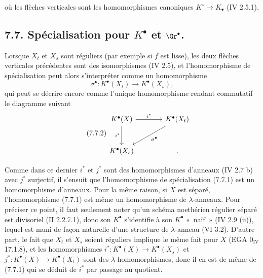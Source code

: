 où les
flèches verticales sont les homomorphismes canoniques \(K^\circ\to K_\bullet\) (IV 2.5.1).

\subsection*{7.7. Spécialisation pour \(K^\bullet\) et \(\Gr^\bullet\).}
Lorsque \(X_t\) et \(X_s\) sont réguliers (par exemple si \(f\) est lisse), les deux flèches verticales précédentes sont des isomorphismes (IV 2.5), et l'homomorphisme de spécialisation peut alors s'interpréter comme un homomorphisme
\begin{equation}\tag{7.7.1}
  \sigma^\bullet:K^\bullet(X_t)\longrightarrow K^\bullet(X_s),
\end{equation}
qui peut se décrire encore comme l'unique homomorphisme rendant commutatif le diagramme suivant
\begin{equation}\tag{7.7.2}
\begin{tikzcd}[column sep=large,row sep=large]
K^\bullet(X) \arrow[r,"i^*"] \arrow[d,"i^*"'] & K^\bullet(X_t) \arrow[dl,"\sigma^\bullet"]\\
K^\bullet(X_s) & {.}
\end{tikzcd}
\end{equation}

Comme dans ce dernier \(i^*\) et \(j^*\) sont des homomorphismes d'anneaux (IV 2.7 b) avec \(j^*\) surjectif, il s'ensuit que l'homomorphisme de spécialisation (7.7.1) est un homomorphisme d'anneaux. Pour la même raison, si \(X\) est séparé, l'homomorphisme (7.7.1) est même un homomorphisme de \(\lambda\)-anneaux. Pour préciser ce point, il faut seulement noter qu'un schéma noethérien régulier séparé est divisoriel (II 2.2.7.1), donc son \(K^\bullet\) s'identifie à son \(K^\bullet\) «~naïf~» (IV 2.9 (ii)), lequel est muni de façon naturelle d'une structure de \(\lambda\)-anneau (VI 3.2). D'autre part, le fait que \(X_t\) et \(X_s\) soient réguliers implique le même fait pour \(X\) (EGA \(0_{\mathrm{IV}}\) 17.1.8), et les homomorphismes \(i^*:K^\bullet(X)\to K^\bullet(X_s)\) et \(j^*:K^\bullet(X)\to K^\bullet(X_t)\) sont des \(\lambda\)-homomorphismes, donc il en est de même de (7.7.1) qui se déduit de \(i^*\) par passage au quotient.

